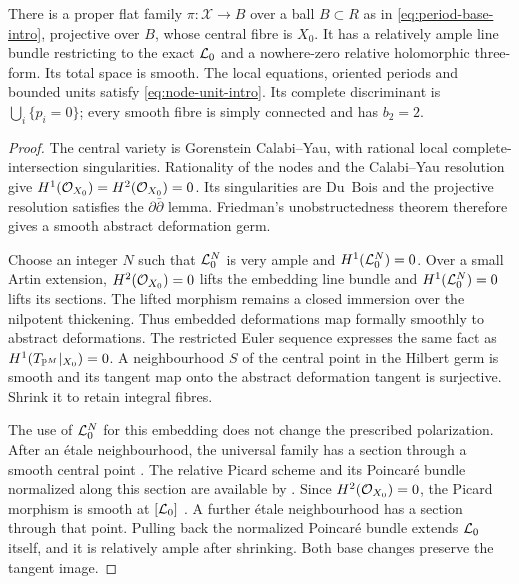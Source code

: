 \begin{proposition}\label{prop:period-family}
There is a proper flat family $\pi:\mathcal X\to B$ over a ball
$B\subset R$ as in \eqref{eq:period-base-intro}, projective over
$B$, whose central fibre is $X_0$. It has a relatively ample line
bundle restricting to the exact $\mathcal L_0$ and a nowhere-zero relative
holomorphic three-form. Its total space is smooth. The local equations,
oriented periods and bounded units satisfy
\eqref{eq:node-unit-intro}. Its complete discriminant is
$\bigcup_i\{p_i=0\}$; every smooth fibre is simply connected and
has $b_2=2$.
\end{proposition}
\begin{proof}
The central variety is Gorenstein Calabi--Yau, with rational local
complete-intersection singularities. Rationality of the nodes and
the Calabi--Yau resolution give
$H^1(\mathcal O_{X_0})=H^2(\mathcal O_{X_0})=0$. Its singularities are Du~Bois
and the projective resolution satisfies the
$\partial\bar\partial$ lemma. Friedman's unobstructedness theorem
\cite[Theorem~1.6]{friedman-unobstructed} therefore gives a smooth
abstract deformation germ.

Choose an integer $N$ such that $\mathcal L_0^N$ is very ample and
$H^1(\mathcal L_0^N)=0$. Over a small Artin extension,
$H^2(\mathcal O_{X_0})=0$ lifts the embedding line bundle and
$H^1(\mathcal L_0^N)=0$ lifts its sections. The lifted morphism remains
a closed immersion over the nilpotent thickening. Thus embedded
deformations map formally smoothly to abstract deformations. The
restricted Euler sequence expresses the same fact as
$H^1(T_{\mathbb P^M}|_{X_0})=0$. A neighbourhood $S$ of the central
point in the Hilbert germ is smooth and its tangent map onto the
abstract deformation tangent is surjective. Shrink it to retain
integral fibres.

The use of $\mathcal L_0^N$ for this embedding does not change the prescribed
polarization. After an étale neighbourhood, the universal family has
a section through a smooth central point \cite[Tag~055S]{stacks}.
The relative Picard scheme and its Poincaré bundle normalized along
this section are available by
\cite[Theorems~2.5(2), 4.8; Exercises~3.11, 4.3 and their solutions]
{kleiman-picard}. Since $H^2(\mathcal O_{X_0})=0$, the Picard morphism is
smooth at $[\mathcal L_0]$ \cite[Proposition~5.19]{kleiman-picard}.
A further étale neighbourhood has a section through that point.
Pulling back the normalized Poincaré bundle extends $\mathcal L_0$ itself,
and it is relatively ample after shrinking. Both base changes preserve
the tangent image.


\end{proof}
